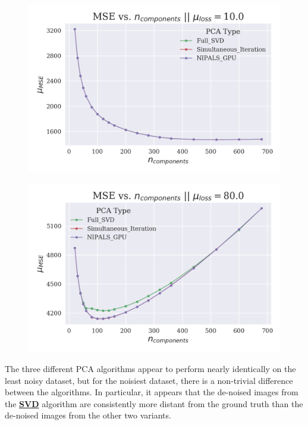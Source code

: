 \documentclass[12pt]{article}
\begin{document}
\begin{figure}[H]
\centering
\begin{minipage}{.45\textwidth}
  \centering
  \includegraphics[width=\linewidth]{Noise10MSE.png}
  \label{Noise10MSE}
\end{minipage}%
\quad
\begin{minipage}{.45\textwidth}
  \centering
  \includegraphics[width=\linewidth]{Noise80MSE.png}
  \label{Noise80MSE}
\end{minipage}
\end{figure}

The three different PCA algorithms appear to perform nearly identically on the least noisy dataset, but for the noisiest dataset, there is a non-trivial difference between the algorithms. In particular, it appears that the de-noised images from the \textbf{\hyperref[3.2]{SVD}} algorithm are consistently more distant from the ground truth than the de-noised images from the other two variants.
\end{document}
